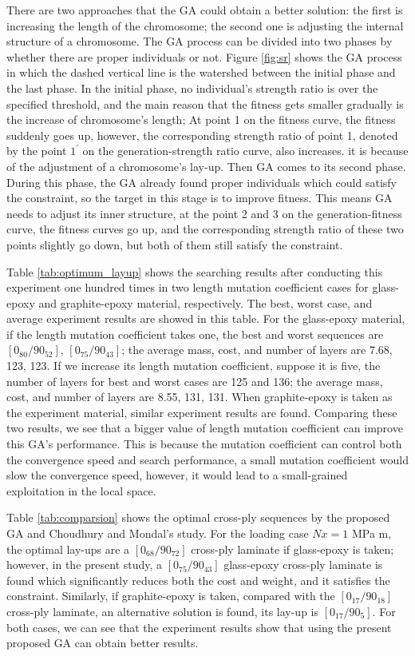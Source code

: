 There are two approaches that the GA could obtain a better solution: the first
is increasing the length of the chromosome; the second one is adjusting the
internal structure of a chromosome. The GA process can be divided into two
phases by whether there are proper individuals or not. Figure
\ref{fig:sr} shows the GA process in which the dashed vertical line is the
watershed between the initial phase and the last phase. In the initial phase,
no individual's strength ratio is over the specified threshold, and the main
reason that the fitness gets smaller gradually is the increase of chromosome's
length; At point 1 on the fitness curve, the fitness suddenly goes up, however,
the corresponding strength ratio of point 1, denoted by the point $1^{\prime}$
on the generation-strength ratio curve, also increases. it is because of the
adjustment of a chromosome's lay-up.  Then GA comes to its second phase. During
this phase, the GA already found proper individuals which could satisfy the
constraint, so the target in this stage is to improve fitness. This means GA
needs to adjust its inner structure, at the point 2 and 3 on the
generation-fitness curve, the fitness curves go up, and the corresponding
strength ratio of these two points slightly go down, but both of them still
satisfy the constraint.



Table \ref{tab:optimum_layup} shows the searching results after conducting this
experiment one hundred times in two length mutation coefficient cases for
glass-epoxy and graphite-epoxy material, respectively. The best, worst case, and
average experiment results are showed in this table.  For the glass-epoxy
material, if the length mutation coefficient takes one, the best and worst
sequences are $[0_{80}/90_{52}]$, $[0_{75}/90_{43}]$; the average mass, cost,
and number of layers are 7.68, 123, 123. If we increase its length mutation
coefficient, suppose it is five, the number of layers for best and worst cases
are 125 and 136;  the average mass, cost, and number of layers are 8.55, 131,
131.  When graphite-epoxy is taken as the experiment material, similar
experiment results are found.  Comparing these two results, we see that a
bigger value of length mutation coefficient can improve this GA's performance.
This is because the mutation coefficient can control both the convergence speed
and search performance, a small mutation coefficient would slow the convergence
speed, however, it would lead to a small-grained exploitation in the local space. 



Table \ref{tab:comparsion} shows the optimal cross-ply sequences by the
proposed GA and  Choudhury and Mondal's\cite{choudhury2019failure} study. For
the loading case $Nx=1$ MPa m, the optimal lay-ups are a $[0_{68}/90_{72}]$
cross-ply laminate if glass-epoxy is taken; however, in the present study, a
$[0_{75}/90_{43}]$ glass-epoxy cross-ply laminate is found which
significantly reduces both the cost and weight, and it satisfies the
constraint.  Similarly, if graphite-epoxy is taken, compared with the
$[0_{17}/90_{18}]$ cross-ply laminate, an alternative solution is found,
its lay-up is $[0_{17}/90_5]$. For both cases, we can see that the experiment
results show that using the present proposed GA can obtain better results.

